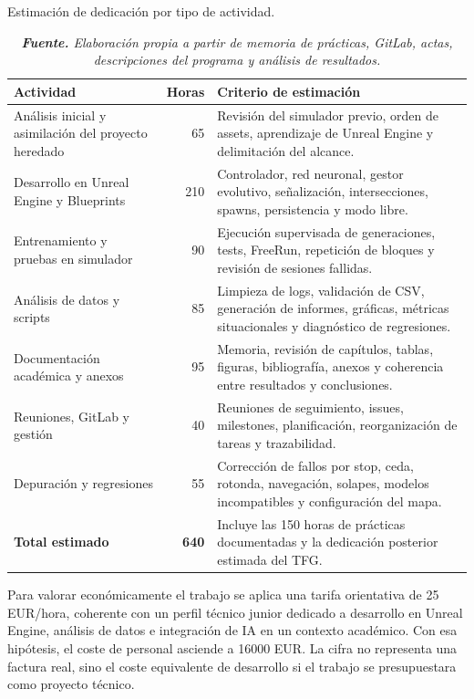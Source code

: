 {\small
\begin{table}[htbp]
\centering
\caption{Estimación de dedicación por tipo de actividad.}%
\label{tab:presupuesto-horas}
\begin{tabularx}{0.96\textwidth}{L{4.3cm}rX}
\toprule
\textbf{Actividad} & \textbf{Horas} & \textbf{Criterio de estimación}\\
\midrule
Análisis inicial y asimilación del proyecto heredado & 65 & Revisión del simulador previo, orden de assets, aprendizaje de Unreal Engine y delimitación del alcance.\\
Desarrollo en Unreal Engine y Blueprints & 210 & Controlador, red neuronal, gestor evolutivo, señalización, intersecciones, spawns, persistencia y modo libre.\\
Entrenamiento y pruebas en simulador & 90 & Ejecución supervisada de generaciones, tests, FreeRun, repetición de bloques y revisión de sesiones fallidas.\\
Análisis de datos y scripts & 85 & Limpieza de logs, validación de CSV, generación de informes, gráficas, métricas situacionales y diagnóstico de regresiones.\\
Documentación académica y anexos & 95 & Memoria, revisión de capítulos, tablas, figuras, bibliografía, anexos y coherencia entre resultados y conclusiones.\\
Reuniones, GitLab y gestión & 40 & Reuniones de seguimiento, issues, milestones, planificación, reorganización de tareas y trazabilidad.\\
Depuración y regresiones & 55 & Corrección de fallos por stop, ceda, rotonda, navegación, solapes, modelos incompatibles y configuración del mapa.\\
\midrule
\textbf{Total estimado} & \textbf{640} & Incluye las 150 horas de prácticas documentadas y la dedicación posterior estimada del TFG.\\
\bottomrule
\end{tabularx}
\caption*{\textit{\textbf{Fuente.} Elaboración propia a partir de memoria de prácticas, GitLab, actas, descripciones del programa y análisis de resultados.}}
\end{table}
}

Para valorar económicamente el trabajo se aplica una tarifa orientativa de 25 EUR/hora, coherente con un perfil técnico junior dedicado a desarrollo en Unreal Engine, análisis de datos e integración de IA en un contexto académico. Con esa hipótesis, el coste de personal asciende a 16000 EUR. La cifra no representa una factura real, sino el coste equivalente de desarrollo si el trabajo se presupuestara como proyecto técnico.

